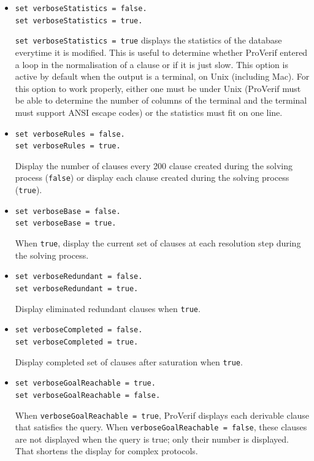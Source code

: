 \documentclass{book}
\newcommand{\tblue}[1]{\textcolor{blue}{REMARK: \emph{#1}}}
\renewcommand{\marginpar}[1]{\tblue{#1}}
\begin{document}
\begin{itemize}
Display information on termination when \lstinline{true}
(changes in the selection function to improve termination;
termination warnings).

\item \lstinline{set verboseStatistics = false.}\\
\lstinline{set verboseStatistics = true.}

\lstinline{set verboseStatistics = true} displays the 
statistics of the database everytime it is modified. This is useful to
determine whether ProVerif entered a loop in the normalisation of a
clause or if it is just slow.
This option is active by default when the output is a terminal,
on Unix (including Mac).
For this option to work properly, either one must be under Unix
(ProVerif must be able to determine the number of columns of the
terminal and the terminal must support ANSI escape codes) or the
statistics must fit on one line.

\item \lstinline{set verboseRules = false.}\\
\lstinline{set verboseRules = true.}

Display the number of clauses every 200 clause created during the solving
process (\lstinline{false}) or display each clause created during the solving
process (\lstinline{true}).

\item \lstinline{set verboseBase = false.}\\
\lstinline{set verboseBase = true.}

When \lstinline{true}, display the current set of clauses at each resolution step during the solving process.

\item \lstinline{set verboseRedundant = false.}\\
\lstinline{set verboseRedundant = true.}

Display eliminated redundant clauses when \lstinline{true}.

\item \lstinline{set verboseCompleted = false.}\\
\lstinline{set verboseCompleted = true.}

Display completed set of clauses after saturation when \lstinline{true}.

\item \lstinline{set verboseGoalReachable = true.}\\
\lstinline{set verboseGoalReachable = false.}

When \lstinline{verboseGoalReachable = true}, ProVerif displays each derivable clause that satisfies the query. When \lstinline{verboseGoalReachable = false}, these clauses are not displayed when the query is true; only their number is displayed. That shortens the display for complex protocols.

\end{itemize}
\end{document}
